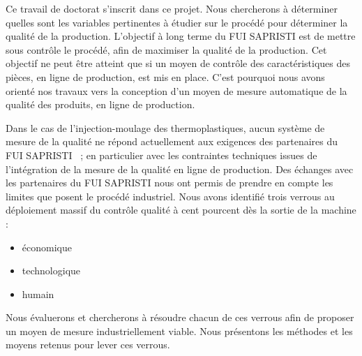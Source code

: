 Ce travail de doctorat s'inscrit dans ce projet.
Nous chercherons à déterminer quelles sont les variables pertinentes à étudier sur le procédé pour déterminer la qualité de la production.
L'objectif à long terme du FUI SAPRISTI est de mettre sous contrôle le procédé, afin de maximiser la qualité de la production.
Cet objectif ne peut être atteint que si un moyen de contrôle des caractéristiques des pièces, en ligne de production, est mis en place.
C'est pourquoi nous avons orienté nos travaux vers la conception d'un moyen de mesure automatique de la qualité des produits, en ligne de production.

Dans le cas de l’injection-moulage des thermoplastiques, aucun système de mesure de la qualité ne répond actuellement aux exigences des partenaires du FUI SAPRISTI \ ; en particulier avec les contraintes techniques issues de l'intégration de la mesure de la qualité en ligne de production.
Des échanges avec les partenaires du FUI SAPRISTI nous ont permis de prendre en compte les limites que posent le procédé industriel.
Nous avons identifié trois verrous au déploiement massif du contrôle qualité à cent pourcent dès la sortie de la machine :
\begin{itemize}
	\item économique
	\item technologique
	\item humain
\end{itemize}
Nous évaluerons et chercherons à résoudre chacun de ces verrous afin de proposer un moyen de mesure industriellement viable.
Nous présentons les méthodes et les moyens retenus pour lever ces verrous.

\bigskip
